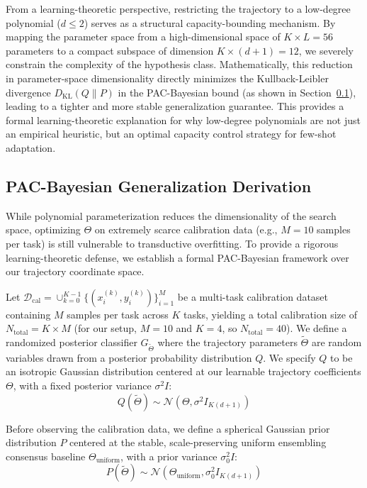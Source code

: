 From a learning-theoretic perspective, restricting the trajectory to a low-degree polynomial ($d \le 2$) serves as a structural capacity-bounding mechanism. By mapping the parameter space from a high-dimensional space of $K \times L = 56$ parameters to a compact subspace of dimension $K \times (d+1) = 12$, we severely constrain the complexity of the hypothesis class. Mathematically, this reduction in parameter-space dimensionality directly minimizes the Kullback-Leibler divergence $D_{\text{KL}}(Q \parallel P)$ in the PAC-Bayesian bound (as shown in Section~\ref{subsec:pac_bayes_derivation}), leading to a tighter and more stable generalization guarantee. This provides a formal learning-theoretic explanation for why low-degree polynomials are not just an empirical heuristic, but an optimal capacity control strategy for few-shot adaptation.

\subsection{PAC-Bayesian Generalization Derivation}
\label{subsec:pac_bayes_derivation}
While polynomial parameterization reduces the dimensionality of the search space, optimizing $\Theta$ on extremely scarce calibration data (e.g., $M = 10$ samples per task) is still vulnerable to transductive overfitting. To provide a rigorous learning-theoretic defense, we establish a formal PAC-Bayesian framework over our trajectory coordinate space.

Let $\mathcal{D}_{\text{cal}} = \cup_{k=0}^{K-1} \{(x_i^{(k)}, y_i^{(k)})\}_{i=1}^{M}$ be a multi-task calibration dataset containing $M$ samples per task across $K$ tasks, yielding a total calibration size of $N_{\text{total}} = K \times M$ (for our setup, $M = 10$ and $K = 4$, so $N_{\text{total}} = 40$). We define a randomized posterior classifier $G_{\tilde{\Theta}}$ where the trajectory parameters $\tilde{\Theta}$ are random variables drawn from a posterior probability distribution $Q$. We specify $Q$ to be an isotropic Gaussian distribution centered at our learnable trajectory coefficients $\Theta$, with a fixed posterior variance $\sigma^2 I$:
\begin{equation}
Q(\tilde{\Theta}) \sim \mathcal{N}\left(\Theta, \sigma^2 I_{K(d+1)}\right)
\end{equation}

Before observing the calibration data, we define a spherical Gaussian prior distribution $P$ centered at the stable, scale-preserving uniform ensembling consensus baseline $\Theta_{\text{uniform}}$, with a prior variance $\sigma_0^2 I$:
\begin{equation}
P(\tilde{\Theta}) \sim \mathcal{N}\left(\Theta_{\text{uniform}}, \sigma_0^2 I_{K(d+1)}\right)
\end{equation}

